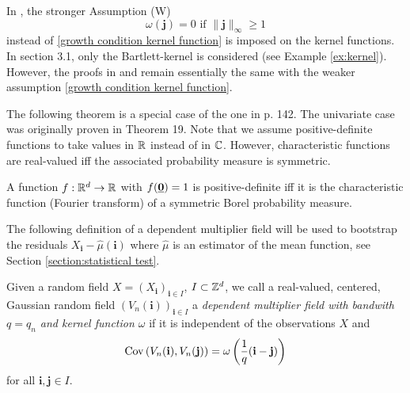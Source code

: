 \begin{remark}
   In \cite{[8]BUCCHIA2015104}, the stronger Assumption (W)
   \begin{equation*}
        \omega\left( \mathbf{j} \right) = 0 \text{ if } \| \mathbf{j} \|_\infty \geq 1
   \end{equation*}
   instead of \eqref{growth condition kernel function} is imposed on the kernel functions. In \cite{[33]lavancier2008VStest} section 3.1, only the Bartlett-kernel is considered (see Example \ref{ex:kernel}). However, the proofs in \cite{[8]BUCCHIA2015104} and \cite{[33]lavancier2008VStest} remain essentially the same with the weaker assumption \eqref{growth condition kernel function}.
\end{remark}

The following theorem is a special case of the one in \cite{loomis1953introduction} p. 142. The univariate case was originally proven in \cite{bochner1933monotone} Theorem 19. Note that we assume positive-definite functions to take values in $\mathbb{R}$ instead of in $\mathbb{C}$. However, characteristic functions are real-valued iff the associated probability measure is symmetric.
\begin{thm}
    A function $f: \mathbb{R}^d \to \mathbb{R}$ with $f(\usbf[0]) = 1$ is positive-definite iff it is the characteristic function (Fourier transform) of a symmetric Borel probability measure.
\end{thm}

The following definition of a dependent multiplier field will be used to bootstrap the residuals $X_\mathbf{i} - \hat{\mu}(\mathbf{i})$ where $\hat{\mu}$ is an estimator of the mean function, see Section \ref{section:statistical test}.
\begin{defn}
    Given a random field $X = (X_\mathbf{i})_{\mathbf{i} \in I}$, $I \subset \mathbb{Z}^d$, we call a real-valued, centered, Gaussian random field $(V_{n}(\mathbf{i}))_{\mathbf{i} \in I}$ a \textit{dependent multiplier field with bandwith $q=q_n$ and kernel function $\omega$} if it is independent of the observations $X$ and
    \begin{equation} \label{dependent multiplier field covariance omega}
        \mathrm{Cov}\left(V_{n}(\mathbf{i}), V_{n}(\mathbf{j})\right) = \omega\left(\frac{1}{q} (\mathbf{i}-\mathbf{j})\right)
    \end{equation}
    for all $\mathbf{i}, \mathbf{j} \in I$.
\end{defn}

